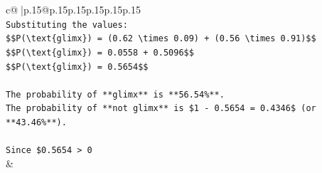 \documentclass{article}
\begin{document}
{\begin{supertabular}{c@{$\;$}|p{.15\linewidth}@{}p{.15\linewidth}p{.15\linewidth}p{.15\linewidth}p{.15\linewidth}p{.15\linewidth}}
{{{\\ 
\texttt{Substituting the values:} \\
\texttt{\$\$P(\textbackslash{}text\{glimx\}) = (0.62 \textbackslash{}times 0.09) + (0.56 \textbackslash{}times 0.91)\$\$} \\
\texttt{\$\$P(\textbackslash{}text\{glimx\}) = 0.0558 + 0.5096\$\$} \\
\texttt{\$\$P(\textbackslash{}text\{glimx\}) = 0.5654\$\$} \\
\\ 
\texttt{The probability of **glimx** is **56.54\%**.} \\
\texttt{The probability of **not glimx** is \$1 {-} 0.5654 = 0.4346\$ (or **43.46\%**).} \\
\\ 
\texttt{Since \$0.5654 > 0} \\
            }
        }
    }
    & \\ \\


\end{supertabular}}
\end{document}
